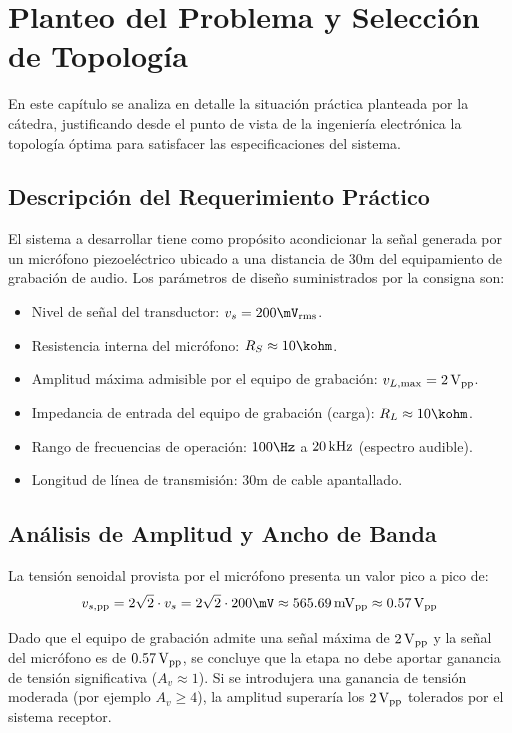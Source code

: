 \chapter{Planteo del Problema y Selección de Topología}
\label{chap:seleccion_topologia}

En este capítulo se analiza en detalle la situación práctica planteada por la cátedra, justificando desde el
punto de vista de la ingeniería electrónica la topología óptima para satisfacer las especificaciones del sistema.

\section{Descripción del Requerimiento Práctico}

El sistema a desarrollar tiene como propósito acondicionar la señal generada por un micrófono piezoeléctrico
ubicado a una distancia de $30\unit{\meter}$ del equipamiento de grabación de audio. Los parámetros de diseño
suministrados por la consigna son:
\begin{itemize}
  \item Nivel de señal del transductor: $v_s = 200\mV_{\mathrm{rms}}$.
  \item Resistencia interna del micrófono: $R_S \approx 10\kohm$.
  \item Amplitud máxima admisible por el equipo de grabación: $v_{L,\mathrm{max}} = 2\,\mathrm{V}_{\mathrm{pp}}$.
  \item Impedancia de entrada del equipo de grabación (carga): $R_L \approx 10\kohm$.
  \item Rango de frecuencias de operación: $100\Hz$ a $20\,\mathrm{kHz}$ (espectro audible).
  \item Longitud de línea de transmisión: $30\unit{\meter}$ de cable apantallado.
\end{itemize}

\section{Análisis de Amplitud y Ancho de Banda}

La tensión senoidal provista por el micrófono presenta un valor pico a pico de:
\begin{equation}
  v_{s,\mathrm{pp}} = 2\sqrt{2} \cdot v_s = 2\sqrt{2} \cdot 200\mV \approx 565.69\mVpp \approx 0.57\Vpp
  \label{eq:vs_pp}
\end{equation}

Dado que el equipo de grabación admite una señal máxima de $2\,\mathrm{V}_{\mathrm{pp}}$ y la señal del micrófono es de $0.57\,\mathrm{V}_{\mathrm{pp}}$,
se concluye que la etapa no debe aportar ganancia de tensión significativa ($A_v \approx 1$). Si se introdujera
una ganancia de tensión moderada (por ejemplo $A_v \ge 4$), la amplitud superaría los $2\,\mathrm{V}_{\mathrm{pp}}$ tolerados por el
sistema receptor.

